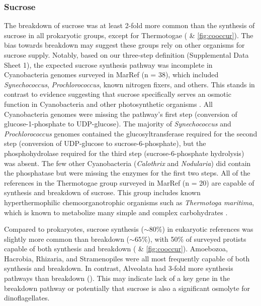 \documentclass[utf8]{frontiersSCNS} %
\begin{document}
\subsubsection*{Sucrose}
The breakdown of sucrose was at least 2-fold more common than the synthesis of sucrose in all prokaryotic groups, except for Thermotogae ( \& \ref{fig:cooccur}). The bias towards breakdown may suggest these groups rely on other organisms for sucrose supply. Notably, based on our three-step definition (Supplemental Data Sheet 1), the expected sucrose synthesis pathway was incomplete in Cyanobacteria genomes  surveyed in MarRef (n = 38), which included \emph{Synechococcus}, \emph{Prochlorococcus}, known nitrogen fixers, and others. This stands in contrast to evidence suggesting that sucrose specifically serves an osmotic function in Cyanobacteria and other photosynthetic organisms \citep{Reed1986,Klahn2011}. All Cyanobacteria genomes were missing the pathway's first step (conversion of glucose-1-phosphate to UDP-glucose). The majority of \emph{Synechococcus} and \emph{Prochlorococcus} genomes contained the glucosyltransferase required for the second step (conversion of UDP-glucose to sucrose-6-phosphate), but the phosphohydrolase required for the third step (sucrose-6-phosphate hydrolysis) was absent. The few other Cyanobacteria (\emph{Calothrix} and \emph{Nodularia}) did contain the phosphatase but were missing the enzymes for the first two steps. All of the references in the Thermotogae group surveyed in MarRef (n = 20) are capable of synthesis and breakdown of sucrose. This group includes known hyperthermophilic chemoorganotrophic organisms such as \emph{Thermotoga maritima}, which is known to metabolize many simple and complex carbohydrates \citep{NELSON2001169}.

Compared to prokaryotes, sucrose synthesis ($\sim 80\%$) in eukaryotic references was slightly more common than breakdown ($\sim 65 \%$), with 50\% of surveyed protists capable of both synthesis and breakdown ( \& \ref{fig:cooccur}). Amoebozoa, Hacrobia, Rhizaria, and Stramenopiles were all most frequently capable of both synthesis and breakdown. In contrast, Alveolata had 3-fold more synthesis pathways than breakdown (). This may indicate lack of a key gene in the breakdown pathway or potentially that sucrose is also a significant osmolyte for dinoflagellates. 
\end{document}
